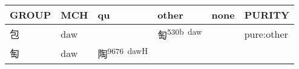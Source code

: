 \documentclass[14pt,a4paper]{scrartcl}
\begin{document}
\begin{longtable}[c]{@{}llllll@{}}
\toprule
\begin{minipage}[b]{0.14\columnwidth}\raggedright\strut
GROUP
\strut\end{minipage} &
\begin{minipage}[b]{0.14\columnwidth}\raggedright\strut
MCH
\strut\end{minipage} &
\begin{minipage}[b]{0.14\columnwidth}\raggedright\strut
qu
\strut\end{minipage} &
\begin{minipage}[b]{0.14\columnwidth}\raggedright\strut
other
\strut\end{minipage} &
\begin{minipage}[b]{0.14\columnwidth}\raggedright\strut
none
\strut\end{minipage} &
\begin{minipage}[b]{0.14\columnwidth}\raggedright\strut
PURITY
\strut\end{minipage}\tabularnewline
\midrule
\endhead
\begin{minipage}[t]{0.14\columnwidth}\raggedright\strut
包
\strut\end{minipage} &
\begin{minipage}[t]{0.14\columnwidth}\raggedright\strut
daw
\strut\end{minipage} &
\begin{minipage}[t]{0.14\columnwidth}\raggedright\strut
\strut\end{minipage} &
\begin{minipage}[t]{0.14\columnwidth}\raggedright\strut
匋\textsuperscript{530b~daw}
\strut\end{minipage} &
\begin{minipage}[t]{0.14\columnwidth}\raggedright\strut
\strut\end{minipage} &
\begin{minipage}[t]{0.14\columnwidth}\raggedright\strut
pure:other
\strut\end{minipage}\tabularnewline
\begin{minipage}[t]{0.14\columnwidth}\raggedright\strut
匋
\strut\end{minipage} &
\begin{minipage}[t]{0.14\columnwidth}\raggedright\strut
daw
\strut\end{minipage} &
\begin{minipage}[t]{0.14\columnwidth}\raggedright\strut
陶\textsuperscript{9676~dawH}
\strut\end{minipage} &

\end{longtable}
\end{document}
